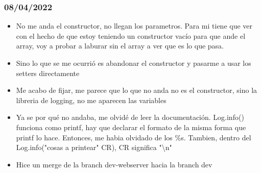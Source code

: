 \documentclass[../informe_krapp.tex]{subfiles}
\begin{document}
\subsubsection{08/04/2022}
\begin{itemize}
	\item No me anda el constructor, no llegan los parametros.
	      Para mi tiene que ver con el hecho de que estoy teniendo un constructor vacío para
	      que ande el array, voy a probar a laburar sin el array a ver que es lo que pasa.
	\item Sino lo que se me ocurrió es abandonar el constructor y pasarme a
	      usar los setters directamente
	\item Me acabo de fijar, me parece que lo que no anda no es el constructor,
	      sino la libreria de logging, no me aparecen las variables
	\item Ya se por qué no andaba, me olvidé de leer la documentación.
	      Log.info() funciona como printf, hay que declarar el formato
	      de la misma forma que printf lo hace.
	      Entonces, me habia olvidado de los \%s.
	      Tambien, dentro del Log.info("cosas a printear" CR), CR significa "\textbackslash n"
	\item Hice un merge de la branch dev-webserver hacia la branch dev
\end{itemize}
\end{document}
